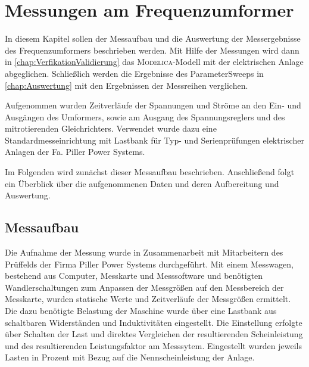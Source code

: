 \chapter{Messungen am Frequenzumformer}
\label{chap:Versuch}
In diesem Kapitel sollen der Messaufbau und die Auswertung der Messergebnisse des Frequenzumformers beschrieben werden. Mit Hilfe der Messungen wird dann in \cref{chap:VerfikationValidierung} das \textsc{Modelica}-Modell mit der elektrischen Anlage abgeglichen. Schließlich werden die Ergebnisse des ParameterSweeps in \cref{chap:Auswertung} mit den Ergebnissen der Messreihen verglichen. 

Aufgenommen wurden Zeitverläufe der Spannungen und Ströme an den Ein- und Ausgängen des Umformers, sowie am Ausgang des Spannungsreglers und des mitrotierenden Gleichrichters. Verwendet wurde dazu eine Standardmesseinrichtung mit Lastbank für Typ- und Serienprüfungen elektrischer Anlagen der Fa. Piller Power Systems. 

Im Folgenden wird zunächst dieser Messaufbau beschrieben. Anschließend folgt ein Überblick über die aufgenommenen Daten und deren Aufbereitung und Auswertung.

\section{Messaufbau}
\label{sec:Messaufbau}
Die Aufnahme der Messung wurde in Zusammenarbeit mit Mitarbeitern des Prüffelds der Firma Piller Power Systems durchgeführt. Mit einem Messwagen, bestehend aus Computer, Messkarte und Messsoftware und benötigten Wandlerschaltungen zum Anpassen der Messgrößen auf den Messbereich der Messkarte, wurden statische Werte und Zeitverläufe der Messgrößen ermittelt. Die dazu benötigte Belastung der Maschine wurde über eine Lastbank aus schaltbaren Widerständen und Induktivitäten eingestellt. Die Einstellung erfolgte über Schalten der Last und direktes Vergleichen der resultierenden Scheinleistung und des resultierenden Leistungsfaktor am Messsytem. Eingestellt wurden jeweils Lasten in Prozent mit Bezug auf die Nennscheinleistung der Anlage. 

